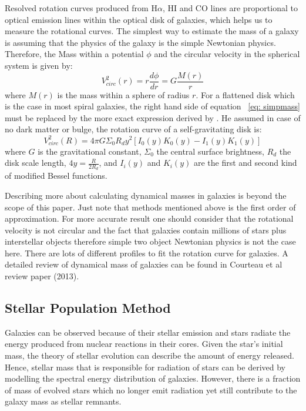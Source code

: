 Resolved rotation curves produced from H$\alpha$, HI and CO lines are proportional to optical emission lines within the optical disk of galaxies, \citep{Courteau13} which helps us to measure the rotational curves. The simplest way to estimate the mass of a galaxy is assuming that the physics of the galaxy is the simple Newtonian physics. Therefore, the Mass within a potential $\phi$ and the circular velocity in the spherical system is given by:
\begin{equation}
\label{eq: simpmass}
V^2_{circ}(r)=r\frac{d\phi}{dr} = G\frac{M(r)}{r}
\end{equation}
where $M(r)$ is the mass within a sphere of radius $r$. For a flattened disk which is the case in most spiral galaxies, the right hand side of equation {~\ref{eq: simpmass}}  must  be replaced by the more exact expression derived by \cite{Freeman70}. He assumed in case of no dark matter or bulge, the rotation curve of a self-gravitating disk is:
\begin{equation}
V^2_{circ}(R)= 4\pi G \Sigma_{0}R_{d} y^2[I_0(y)K_0(y) - I_1(y)K_1(y)]
\end{equation}
where $G$ is the gravitational constant, $\Sigma_0$ the central surface brightness, $R_d$ the disk scale length, $4y=\frac{R}{2R_d}$, and $I_i(y)$ and $K_i(y)$ are the first and second kind of modified Bessel functions.

Describing more about calculating dynamical masses in galaxies is beyond the scope of this paper. Just note that methods mentioned above is the first order of approximation. For more accurate result one should consider that the rotational velocity is not circular and the fact that galaxies contain millions of stars plus interstellar objects therefore simple two object Newtonian physics is not the case here. There are lots of different profiles to fit the rotation curve for galaxies. A detailed review of dynamical mass of galaxies can be found in Courteau et al review paper (2013).

\subsection{Stellar Population Method}
Galaxies can be observed because of their stellar emission and stars radiate the energy produced from nuclear reactions in their cores. Given the star's initial mass, the theory of stellar evolution can describe the amount of energy released. Hence, stellar mass that is responsible for radiation of stars can be derived by modelling the spectral energy distribution of galaxies. However, there is a fraction of mass of evolved stars which no longer emit radiation yet still contribute to the galaxy mass as stellar remnants. 

